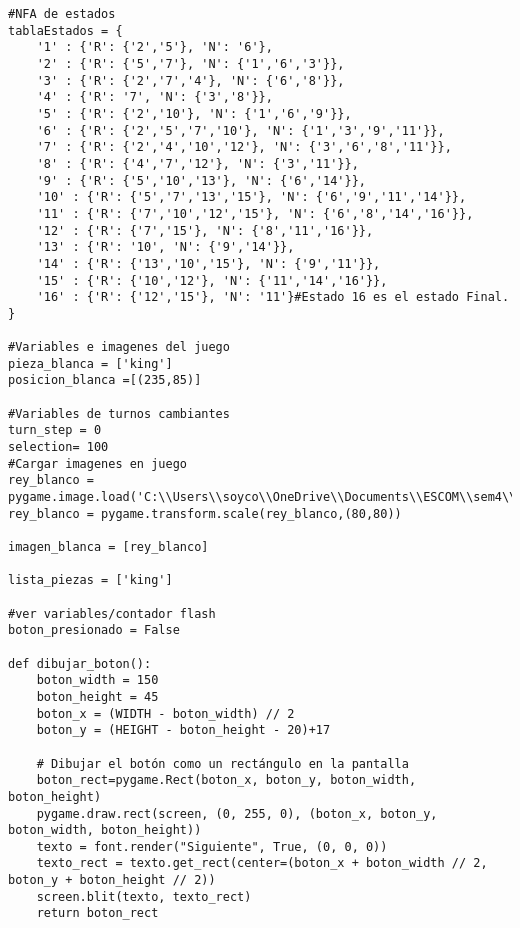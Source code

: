 \begin{enumerate}
\begin{lstlisting}
#NFA de estados
tablaEstados = {
    '1' : {'R': {'2','5'}, 'N': '6'},
    '2' : {'R': {'5','7'}, 'N': {'1','6','3'}},
    '3' : {'R': {'2','7','4'}, 'N': {'6','8'}},
    '4' : {'R': '7', 'N': {'3','8'}},
    '5' : {'R': {'2','10'}, 'N': {'1','6','9'}},
    '6' : {'R': {'2','5','7','10'}, 'N': {'1','3','9','11'}},
    '7' : {'R': {'2','4','10','12'}, 'N': {'3','6','8','11'}},
    '8' : {'R': {'4','7','12'}, 'N': {'3','11'}},
    '9' : {'R': {'5','10','13'}, 'N': {'6','14'}},
    '10' : {'R': {'5','7','13','15'}, 'N': {'6','9','11','14'}},
    '11' : {'R': {'7','10','12','15'}, 'N': {'6','8','14','16'}},
    '12' : {'R': {'7','15'}, 'N': {'8','11','16'}},
    '13' : {'R': '10', 'N': {'9','14'}},
    '14' : {'R': {'13','10','15'}, 'N': {'9','11'}},
    '15' : {'R': {'10','12'}, 'N': {'11','14','16'}},
    '16' : {'R': {'12','15'}, 'N': '11'}#Estado 16 es el estado Final.
}

#Variables e imagenes del juego
pieza_blanca = ['king']
posicion_blanca =[(235,85)]

#Variables de turnos cambiantes
turn_step = 0
selection= 100
#Cargar imagenes en juego
rey_blanco = pygame.image.load('C:\\Users\\soyco\\OneDrive\\Documents\\ESCOM\\sem4\\Teoria\\P2\\Chess\\img\\white_king.png')
rey_blanco = pygame.transform.scale(rey_blanco,(80,80))

imagen_blanca = [rey_blanco]

lista_piezas = ['king']

#ver variables/contador flash
boton_presionado = False

def dibujar_boton():
    boton_width = 150
    boton_height = 45
    boton_x = (WIDTH - boton_width) // 2
    boton_y = (HEIGHT - boton_height - 20)+17

    # Dibujar el botón como un rectángulo en la pantalla
    boton_rect=pygame.Rect(boton_x, boton_y, boton_width, boton_height)
    pygame.draw.rect(screen, (0, 255, 0), (boton_x, boton_y, boton_width, boton_height))
    texto = font.render("Siguiente", True, (0, 0, 0))
    texto_rect = texto.get_rect(center=(boton_x + boton_width // 2, boton_y + boton_height // 2))
    screen.blit(texto, texto_rect)
    return boton_rect
    

\end{lstlisting}
\end{enumerate}
